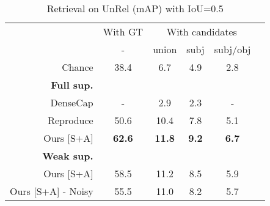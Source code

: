 \documentclass[10pt,twocolumn,letterpaper]{article}
\newcommand{\ra}[1]{\renewcommand{\arraystretch}{#1}}
\begin{document}
\begin{table}\centering
{\small
\centering
\ra{1}
\begin{tabular}{@{}rccccc@{}}\toprule
& \multicolumn{1}{c}{With GT} & \multicolumn{3}{c}{With candidates} \\
& - & union & subj & subj/obj
\\\midrule
Chance 							& 38.4	& 6.7 	& 4.9 	& 2.8 \\
\textbf{Full sup.}\\
DenseCap \cite{Johnson2015} 		& - 		& 2.9 	& 2.3 	& - \\
Reproduce \cite{Lu16} 			& 50.6 	& 10.4 	& 7.8 	& 5.1  \\
Ours [S+A] 				&  \textbf{62.6} & \textbf{11.8} 	& \textbf{9.2} & \textbf{6.7} \\
\rule{0pt}{1ex}  
\textbf{Weak sup.}\\
Ours [S+A] 						&  58.5 	& 11.2 	& 8.5 	& 5.9 \\
Ours [S+A] - Noisy				&  55.5 	& 11.0	& 8.2	& 5.7 \\
\bottomrule
\end{tabular}
\caption{Retrieval on UnRel (mAP) with IoU=0.5} 
\label{tab:results_rarerel_appendix}
}
\end{table}
\end{document}
